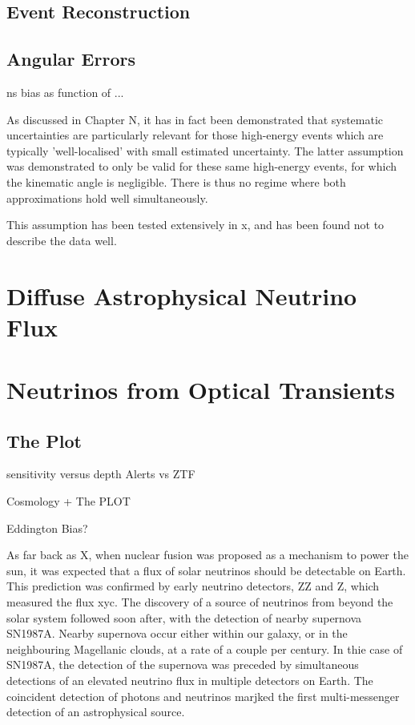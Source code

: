 \subsection{Event Reconstruction}
\subsection{Angular Errors}

ns bias as function of ...

As discussed in Chapter N, it has in fact been demonstrated that systematic uncertainties are particularly relevant for those high-energy events which are typically 'well-localised' with small estimated uncertainty. The latter assumption was demonstrated to only be valid for these same high-energy events, for which the kinematic angle is negligible. There is thus no regime where both approximations hold well simultaneously.

This assumption has been tested extensively in x, and has been found not to describe the data well.

\section{Diffuse Astrophysical Neutrino Flux}

\section{Neutrinos from Optical Transients}
\subsection{The Plot}
sensitivity versus depth
Alerts vs ZTF

Cosmology + The PLOT

Eddington Bias?

As far back as X, when nuclear fusion was proposed as a mechanism to power the sun, it was expected that a flux of solar neutrinos should be detectable on Earth. This prediction was confirmed by early neutrino detectors, ZZ and Z, which measured the flux xyc.
The discovery of a source of neutrinos from beyond the solar system followed soon after, with the detection of nearby supernova SN1987A. Nearby supernova occur either within our galaxy, or in the neighbouring Magellanic clouds, at a rate of a couple per century. In thie case of SN1987A, the detection of the supernova was preceded by simultaneous detections of an elevated neutrino flux in multiple detectors on Earth. The coincident detection of photons and neutrinos marjked the first multi-messenger detection of an astrophysical source.

